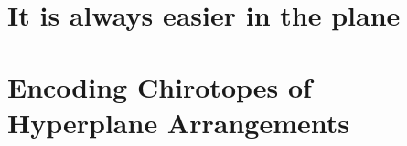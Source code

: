 \section{It is always easier in the plane}




\section{Encoding Chirotopes of Hyperplane Arrangements}\label{sec:hyperplanes}


